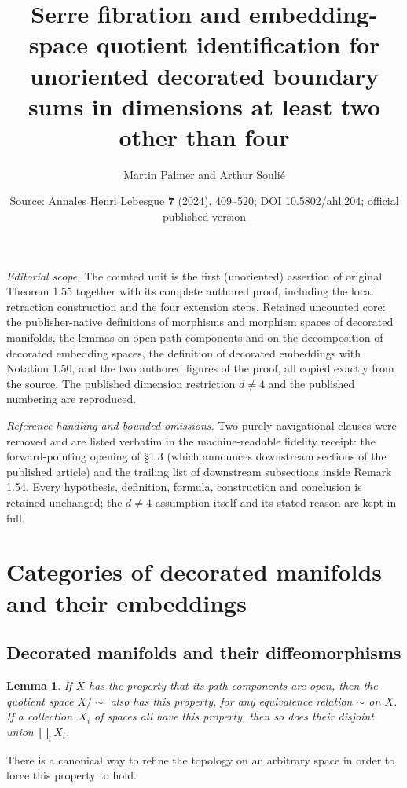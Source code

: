 \documentclass[10pt,a4paper]{amsart}
\title[Serre fibration for unoriented decorated boundary sums]{Serre fibration and embedding-space quotient identification for unoriented decorated boundary sums in dimensions at least two other than four}
\author{Martin Palmer and Arthur Souli\'e}
\date{Source: Annales Henri Lebesgue \textbf{7} (2024), 409--520; DOI 10.5802/ahl.204; official published version}
\numberwithin{equation}{section}
\newtheorem{lemm}[theo]{Lemma}
\theoremstyle{definition}
\theoremstyle{remark}
\begin{document}
\maketitle
\noindent\textit{Editorial scope.} The counted unit is the first (unoriented) assertion of original Theorem 1.55 together with its complete authored proof, including the local retraction construction and the four extension steps. Retained uncounted core: the publisher-native definitions of morphisms and morphism spaces of decorated manifolds, the lemmas on open path-components and on the decomposition of decorated embedding spaces, the definition of decorated embeddings with Notation 1.50, and the two authored figures of the proof, all copied exactly from the source. The published dimension restriction $d\neq 4$ and the published numbering are reproduced.\par
\noindent\textit{Reference handling and bounded omissions.} Two purely navigational clauses were removed and are listed verbatim in the machine-readable fidelity receipt: the forward-pointing opening of \S 1.3 (which announces downstream sections of the published article) and the trailing list of downstream subsections inside Remark 1.54. Every hypothesis, definition, formula, construction and conclusion is retained unchanged; the $d\neq 4$ assumption itself and its stated reason are kept in full.
\section{Categories of decorated manifolds and their embeddings}\label{s:categorical_framework}

\subsection{Decorated manifolds and their diffeomorphisms}\label{ss:topological_groupoids_of_decorated_manifolds}

\setcounter{theo}{2}
\begin{lemm}\label{lem:open-path-components}
If $X$ has the property that its path-components are open, then the quotient space $X/{\sim}$ also has this property, for any equivalence relation $\sim$ on $X$. If a collection~$X_i$ of spaces all have this property, then so does their disjoint union $\bigsqcup_i X_i$.
\end{lemm}

There is a canonical way to refine the topology on an arbitrary space in order to force this property to hold.
\end{document}
